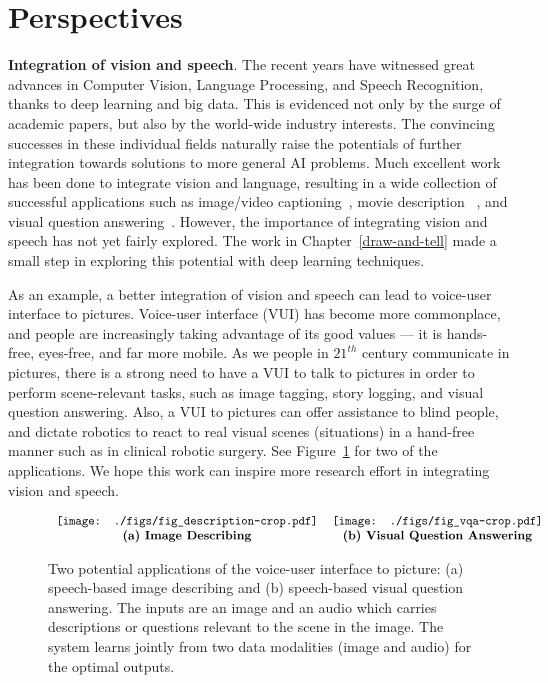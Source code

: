 \section{Perspectives} 

\textbf{Integration of vision and speech}. 
The recent years have witnessed great advances in Computer Vision,
Language Processing, and Speech Recognition, thanks to deep learning
and big data. This is evidenced not only by the surge of academic papers, but also by the world-wide industry interests. 
The convincing successes in these individual fields naturally raise
the potentials of further integration towards solutions to more general AI
problems. Much excellent work has been done to integrate vision and
language, resulting in a wide collection of successful applications
such as image/video captioning~\citep{show:tell:caption}, movie description
~\citep{movie:dataset}, and visual question answering~\citep{VQA}. However, the importance of integrating vision and
speech has not yet fairly explored.  The work in Chapter~\ref{draw-and-tell} made a small step in exploring this
potential with deep learning techniques.  

As an example, a better integration of vision and speech can lead to voice-user interface to pictures.  
Voice-user interface (VUI) has become more commonplace, and people are increasingly taking advantage of its good values --- it is hands-free, eyes-free, and far more mobile. As we people in $21^{th}$ century communicate in pictures,  there is a strong need to have a VUI to talk to pictures in order to perform scene-relevant tasks, such as image tagging, story logging, and visual question answering. Also, a VUI to pictures can offer assistance to blind people, and dictate robotics to react to real visual scenes (situations) in a hand-free manner such as in clinical robotic surgery. See Figure~\ref{con:fig:app} for two of the applications. 
We hope this work can inspire more research effort in integrating vision and speech. 

\begin{figure}
$\begin{tabular}{cccccc}
\texttt{[image: ./figs/fig\_description-crop.pdf]} &
\texttt{[image: ./figs/fig\_vqa-crop.pdf]} \\
\text{\textbf{(a) Image Describing}} &  
\text{\textbf{(b) Visual Question Answering}} \\  
\end{tabular}$
\caption{Two potential applications of the voice-user interface to picture: (a) speech-based
  image describing and (b) speech-based visual question answering. The
  inputs are an image and an audio which carries descriptions or questions relevant to the scene in the image. The system learns jointly from two data modalities (image and audio) for the optimal outputs.} 
\label{con:fig:app} 
\end{figure}

